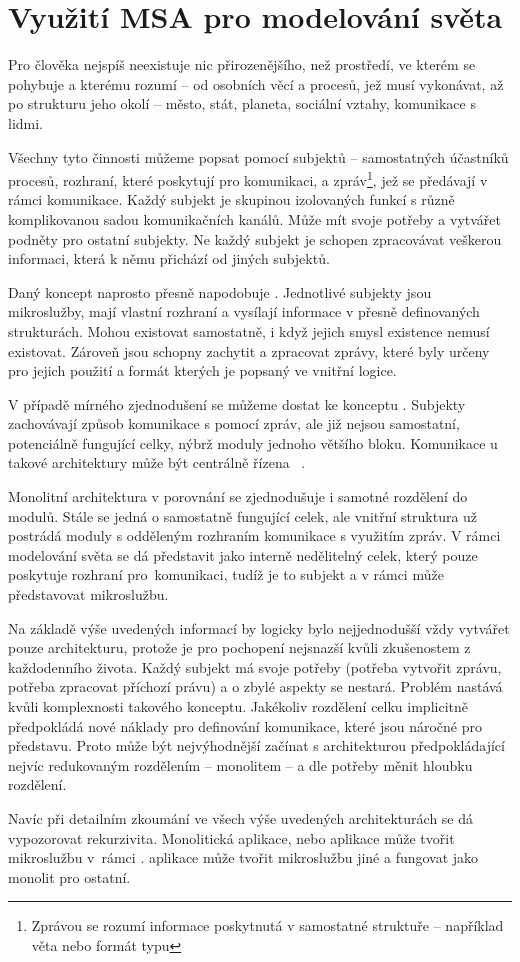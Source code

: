 \section{Využití MSA pro modelování světa}\label{sec:msa-model-of-world}

Pro člověka nejspíš neexistuje nic přirozenějšího, než prostředí, ve kterém se pohybuje a kterému rozumí – od osobních věcí a procesů, jež musí vykonávat, až po strukturu jeho okolí – město, stát, planeta, sociální vztahy, komunikace s lidmi.

Všechny tyto činnosti můžeme popsat pomocí subjektů – samostatných účastníků procesů, rozhraní, které poskytují pro komunikaci, a zpráv\footnote{Zprávou se rozumí informace poskytnutá v samostatné struktuře – například věta nebo formát typu }, jež se předávají v rámci komunikace.
Každý subjekt je skupinou izolovaných funkcí s různě komplikovanou sadou komunikačních kanálů.
Může mít svoje potřeby a vytvářet podněty pro ostatní subjekty.
Ne každý subjekt je schopen zpracovávat veškerou informaci, která k němu přichází od jiných subjektů.

Daný koncept naprosto přesně napodobuje .
Jednotlivé subjekty jsou mikroslužby, mají vlastní rozhraní a vysílají informace v přesně definovaných strukturách.
Mohou existovat samostatně, i když jejich smysl existence nemusí existovat.
Zároveň jsou schopny zachytit a zpracovat zprávy, které byly určeny pro jejich použití a formát kterých je popsaný ve vnitřní logice.

V případě mírného zjednodušení se můžeme dostat ke konceptu .
Subjekty zachovávají způsob komunikace s pomocí zpráv, ale již nejsou samostatní, potenciálně fungující celky, nýbrž moduly jednoho většího bloku.
Komunikace u takové architektury může být centrálně řízena ~\cite{soavsmsa}.

Monolitní architektura v porovnání se  zjednodušuje i samotné rozdělení do modulů.
Stále se jedná o samostatně fungující celek, ale vnitřní struktura už postrádá moduly s odděleným rozhraním komunikace s využitím zpráv.
V rámci modelování světa se dá představit jako interně nedělitelný celek, který pouze poskytuje rozhraní pro~komunikaci, tudíž je to subjekt a v rámci  může představovat mikroslužbu.

Na základě výše uvedených informací by logicky bylo nejjednodušší vždy vytvářet pouze  architekturu, protože je pro pochopení nejsnazší kvůli zkušenostem z každodenního života.
Každý subjekt má svoje potřeby (potřeba vytvořit zprávu, potřeba zpracovat příchozí právu) a o zbylé aspekty se nestará.
Problém nastává kvůli komplexnosti takového konceptu.
Jakékoliv rozdělení celku implicitně předpokládá nové náklady pro definování komunikace, které jsou náročné pro představu.
Proto může být nejvýhodnější začínat s architekturou předpokládající nejvíc redukovaným rozdělením – monolitem – a dle potřeby měnit hloubku rozdělení.

Navíc při detailním zkoumání ve všech výše uvedených architekturách se dá vypozorovat rekurzivita.
Monolitická aplikace, nebo  aplikace může tvořit mikroslužbu v~rámci .
 aplikace může tvořit mikroslužbu jiné  a fungovat jako monolit pro ostatní.
